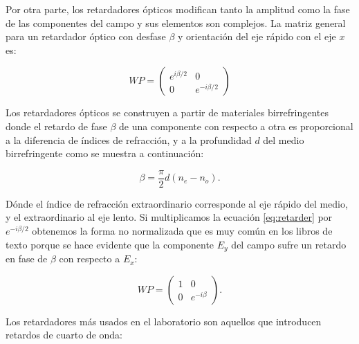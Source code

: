 Por otra parte, los retardadores ópticos modifican tanto la amplitud
como la fase de las componentes del campo y sus elementos son
complejos. La matriz general para un retardador óptico con desfase
$\beta $ y orientación del eje rápido con el eje
$x$ es:

\begin{equation*}
WP = 
\begin{pmatrix}
e^{i\beta/2} & 0 \\0&e^{-i\beta/2}  
\end{pmatrix}
\label{eq:retarder}
\end{equation*}

Los retardadores ópticos se construyen a partir de materiales
birrefringentes donde el retardo de fase $\beta$ de una componente con respecto a otra es
proporcional a la diferencia de índices de refracción, y a la
profundidad $d$ del medio birrefringente como se muestra a continuación:

$$\beta= \frac{\pi}{2}d\left(n_e-n_o\right).$$ 

Dónde el índice de refracción extraordinario corresponde al eje rápido
del medio, y el extraordinario al eje lento. Si multiplicamos la
ecuación \ref{eq:retarder} por $e^{-i\beta/2} $ 
obtenemos la forma no normalizada que es muy común en los libros de
texto porque se hace evidente que la componente $E_y$ del campo sufre un
retardo en fase de $\beta$ con respecto a $E_x$: 

\begin{equation*}
WP = 
\begin{pmatrix}
1& 0 \\0&e^{-i\beta}  
\end{pmatrix}.
\label{eq:retarder_2}
\end{equation*}

Los retardadores más usados en el laboratorio son aquellos que
introducen retardos de cuarto de onda:

